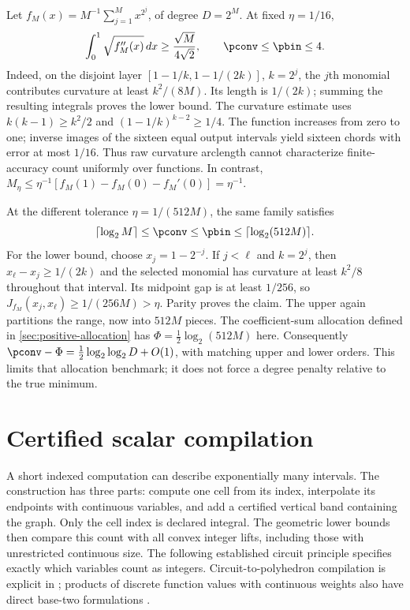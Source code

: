 \begin{example}
\label{ex:positive-degree-gap}
Let $f_M(x)=M^{-1}\sum_{j=1}^M x^{2^j}$, of degree $D=2^M$.
At fixed $\eta=1/16$,
\begin{equation}\label{eq:raw-curvature-obstruction}
 \int_0^1\sqrt{f_M''(x)}\,dx\ge\frac{\sqrt M}{4\sqrt2},
 \qquad \pconv\le\pbin\le4.
\end{equation}
Indeed, on the disjoint layer
$[1-1/k,1-1/(2k)]$, $k=2^j$, the $j$th monomial contributes curvature
at least $k^2/(8M)$. Its length is $1/(2k)$; summing the resulting
integrals proves the lower bound. The curvature estimate uses
$k(k-1)\ge k^2/2$ and $(1-1/k)^{k-2}\ge1/4$.
The function increases from zero to one; inverse images of the sixteen
equal output intervals yield sixteen chords with error at most $1/16$.
Thus raw curvature arclength cannot characterize finite-accuracy count
uniformly over functions. In contrast,
$M_\eta\le\eta^{-1}[f_M(1)-f_M(0)-f_M'(0)]=\eta^{-1}$.

At the different tolerance $\eta=1/(512M)$, the same family satisfies
\begin{equation}\label{eq:degree-allocation-obstruction}
 \lceil\log_2M\rceil\le\pconv\le\pbin
 \le\lceil\log_2(512M)\rceil.
\end{equation}
For the lower bound, choose $x_j=1-2^{-j}$. If $j<\ell$ and $k=2^j$,
then $x_\ell-x_j\ge1/(2k)$ and the selected monomial has curvature
at least $k^2/8$ throughout that interval. Its midpoint gap is at least
$1/256$, so $J_{f_M}(x_j,x_\ell)\ge1/(256M)>\eta$. Parity proves
the claim. The upper again partitions the range, now into $512M$ pieces.
The coefficient-sum allocation defined in \cref{sec:positive-allocation}
has $\Phi=\frac12\log_2(512M)$ here. Consequently
$\pconv-\Phi=\frac12\log_2\log_2D+O(1)$, with matching upper
and lower orders. This limits that allocation benchmark; it does not
force a degree penalty relative to the true minimum.
\end{example}

\section{Certified scalar compilation}\label{sec:scalar-compilation}

A short indexed computation can describe exponentially many intervals.
The construction has three parts: compute one cell from its index,
interpolate its endpoints with continuous variables, and add a certified
vertical band containing the graph. Only the cell index is declared
integral. The geometric lower bounds then compare this count with all
convex integer lifts, including those with unrestricted continuous size.
The following established circuit principle specifies exactly which
variables count as integers. Circuit-to-polyhedron compilation is explicit
in \citet[Section 3, Lemma 1]{avis2019}; products of discrete function
values with continuous weights also have direct base-two formulations
\citep[Section 2]{adams2012}.

